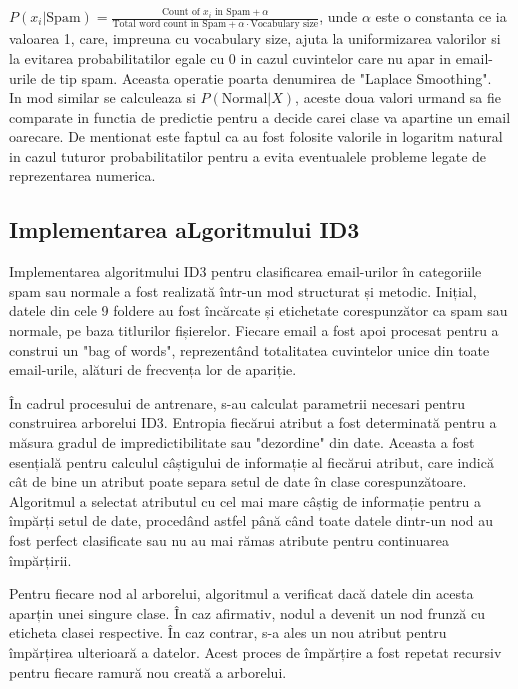 \documentclass{article}
\begin{document}
    $P(x_i | \text{Spam}) = \frac{{\text{Count of } x_i \text{ in Spam} + \alpha}}{{\text{Total word count in Spam} + \alpha \cdot \text{Vocabulary size}}}$, unde $\alpha$ este o constanta ce ia valoarea 1, care, impreuna cu vocabulary size, ajuta la uniformizarea valorilor si la evitarea probabilitatilor egale cu 0 in cazul cuvintelor care nu apar in email-urile de tip spam. Aceasta operatie poarta denumirea de "Laplace Smoothing".
    \\ 
    In mod similar se calculeaza si $ P(\text{Normal} | X)$, aceste doua valori urmand sa fie comparate in functia de predictie pentru a decide carei clase va apartine un email oarecare. De mentionat este faptul ca au fost folosite valorile in logaritm natural in cazul tuturor probabilitatilor pentru a evita eventualele probleme legate de reprezentarea numerica.



\subsection{Implementarea aLgoritmului ID3}
Implementarea algoritmului ID3 pentru clasificarea email-urilor în categoriile spam sau normale a fost realizată într-un mod structurat și metodic. Inițial, datele din cele 9 foldere au fost încărcate și etichetate corespunzător ca spam sau normale, pe baza titlurilor fișierelor. Fiecare email a fost apoi procesat pentru a construi un "bag of words", reprezentând totalitatea cuvintelor unice din toate email-urile, alături de frecvența lor de apariție.

În cadrul procesului de antrenare, s-au calculat parametrii necesari pentru construirea arborelui ID3. Entropia fiecărui atribut a fost determinată pentru a măsura gradul de impredictibilitate sau "dezordine" din date. Aceasta a fost esențială pentru calculul câștigului de informație al fiecărui atribut, care indică cât de bine un atribut poate separa setul de date în clase corespunzătoare. Algoritmul a selectat atributul cu cel mai mare câștig de informație pentru a împărți setul de date, procedând astfel până când toate datele dintr-un nod au fost perfect clasificate sau nu au mai rămas atribute pentru continuarea împărțirii.

Pentru fiecare nod al arborelui, algoritmul a verificat dacă datele din acesta aparțin unei singure clase. În caz afirmativ, nodul a devenit un nod frunză cu eticheta clasei respective. În caz contrar, s-a ales un nou atribut pentru împărțirea ulterioară a datelor. Acest proces de împărțire a fost repetat recursiv pentru fiecare ramură nou creată a arborelui.
\end{document}
